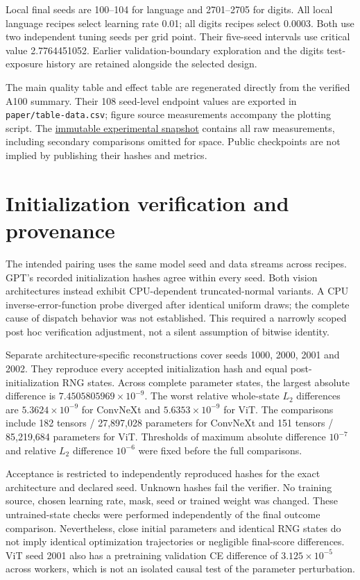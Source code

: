 \documentclass[10pt,letterpaper]{article}
\begin{document}
Local final seeds are 100--104 for language and 2701--2705 for digits. All local language recipes select learning rate 0.01; all digits recipes select 0.0003. Both use two independent tuning seeds per grid point. Their five-seed intervals use critical value 2.7764451052. Earlier validation-boundary exploration and the digits test-exposure history are retained alongside the selected design.

The main quality table and effect table are regenerated directly from the verified A100 summary. Their 108 seed-level endpoint values are exported in \texttt{paper/table-data.csv}; figure source measurements accompany the plotting script. The \href{https://github.com/yaroslavvb/gradient-dissent/tree/28f9db3bdc2e8910a105c7e40944b521c8bf0c1f/experiments}{immutable experimental snapshot} contains all raw measurements, including secondary comparisons omitted for space. Public checkpoints are not implied by publishing their hashes and metrics.

\clearpage
\section{Initialization verification and provenance}\label{app:audit}
The intended pairing uses the same model seed and data streams across recipes. GPT's recorded initialization hashes agree within every seed. Both vision architectures instead exhibit CPU-dependent truncated-normal variants. A CPU inverse-error-function probe diverged after identical uniform draws; the complete cause of dispatch behavior was not established. This required a narrowly scoped post hoc verification adjustment, not a silent assumption of bitwise identity.

Separate architecture-specific reconstructions cover seeds 1000, 2000, 2001 and 2002. They reproduce every accepted initialization hash and equal post-initialization RNG states. Across complete parameter states, the largest absolute difference is $7.4505805969\times10^{-9}$. The worst relative whole-state $L_2$ differences are $5.3624\times10^{-9}$ for ConvNeXt and $5.6353\times10^{-9}$ for ViT. The comparisons include 182 tensors / 27,897,028 parameters for ConvNeXt and 151 tensors / 85,219,684 parameters for ViT. Thresholds of maximum absolute difference $10^{-7}$ and relative $L_2$ difference $10^{-6}$ were fixed before the full comparisons.

Acceptance is restricted to independently reproduced hashes for the exact architecture and declared seed. Unknown hashes fail the verifier. No training source, chosen learning rate, mask, seed or trained weight was changed. These untrained-state checks were performed independently of the final outcome comparison. Nevertheless, close initial parameters and identical RNG states do not imply identical optimization trajectories or negligible final-score differences. ViT seed 2001 also has a pretraining validation CE difference of $3.125\times10^{-5}$ across workers, which is not an isolated causal test of the parameter perturbation.
\end{document}
